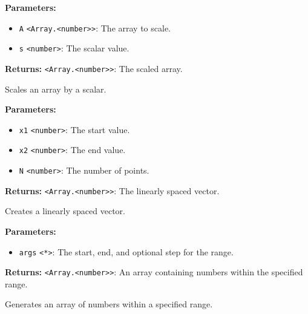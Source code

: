 \documentclass[12pt,a4paper]{article}
\begin{document}
\noindent \textbf{Parameters:}
\begin{itemize}
  \item \texttt{A} \texttt{<Array.<number>>}: The array to scale.
  \item \texttt{s} \texttt{<number>}: The scalar value.
\end{itemize}

\noindent \textbf{Returns:} \texttt{<Array.<number>>}: The scaled array.

\noindent Scales an array by a scalar.

\vspace{5mm}
\noindent {}


\noindent \textbf{Parameters:}
\begin{itemize}
  \item \texttt{x1} \texttt{<number>}: The start value.
  \item \texttt{x2} \texttt{<number>}: The end value.
  \item \texttt{N} \texttt{<number>}: The number of points.
\end{itemize}

\noindent \textbf{Returns:} \texttt{<Array.<number>>}: The linearly spaced vector.

\noindent Creates a linearly spaced vector.

\vspace{5mm}
\noindent {}


\noindent \textbf{Parameters:}
\begin{itemize}
  \item \texttt{args} \texttt{<*>}: The start, end, and optional step for the range.
\end{itemize}

\noindent \textbf{Returns:} \texttt{<Array.<number>>}: An array containing numbers within the specified range.

\noindent Generates an array of numbers within a specified range.

\vspace{5mm}
\noindent {}
\end{document}
